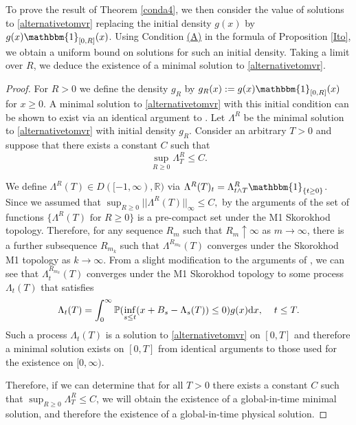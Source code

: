 \documentclass[11pt]{article}
\theoremstyle{plain}
\theoremstyle{remark}
\theoremstyle{definition}
\numberwithin{equation}{section}
\begin{document}
To prove the result of Theorem \ref{conda4}, we then consider the value of solutions to \eqref{alternativetomvr} replacing the initial density $g(x)$ by $g(x)\mathbbm{1}_{[0,R]}(x)$. Using Condition \hyperlink{A}{(A)} in the formula of Proposition \ref{Ito}, we obtain a uniform bound on solutions for such an initial density. Taking a limit over $R$, we deduce the existence of a minimal solution to \eqref{alternativetomvr}. 

\begin{proof}

For $R>0$ we define the density $g_R$ by $g_R(x):=g(x)\mathbbm{1}_{[0,R]}(x)$ for $x\geq 0$. A minimal solution to \eqref{alternativetomvr} with this initial condition can be shown to exist via an identical argument to \cite[Theorem 4.1]{ledger2024supercooledstefanproblemtransport}. Let $\Lambda^R$ be the minimal solution to \eqref{alternativetomvr} with initial density $g_R$. Consider an arbitrary $T>0$ and suppose that there exists a constant $C$ such that $$\sup_{R\geq 0}\Lambda_T^{R}\leq  C.$$ 

We define $\Lambda^R(T)\in D([-1,\infty),\mathbb{R})$ via $\Lambda^R(T)_t=\Lambda^R_{t\wedge T}\mathbbm{1}_{\{t\geq 0\}}$. Since we assumed that $\sup_{R\geq 0}||\Lambda^{R}(T)||_\infty\leq C,$ by the arguments of \cite[Theorem 12.12.2]{whitt} the set of functions $\{\Lambda^{R}(T) \textrm{ for }{R\geq 0}\}$ is a pre-compact set under the M1 Skorokhod topology. Therefore, for any sequence $R_m$ such that $R_m\uparrow\infty$ as $m\rightarrow\infty$, there is a further subsequence $R_{m_k}$ such that $\Lambda^{R_{m_k}}(T)$ converges under the Skorokhod M1 topology as $k\rightarrow\infty$. From a slight modification to the arguments of \cite[Proposition 2.1]{minimal}, we can see that $\Lambda^{R_{m_k}}_t(T)$
converges under the M1 Skorokhod topology to some process $\Lambda_t(T)$ that satisfies
\begin{align}\label{a4sol}\Lambda_t(T)=\int_0^\infty \mathbb{P}(\inf_{s\leq t}(x+B_s-\Lambda_s(T))\leq 0) g(x)\textrm{d}x, \hspace{0.4cm} t\leq T.\end{align}
Such a process $\Lambda_t(T)$ is a solution to \eqref{alternativetomvr} on $[0,T]$ and therefore a minimal solution exists on $[0,T]$ from identical arguments to those used for the existence on $[0,\infty)$. 

Therefore, if we can determine that for all $T>0$ there exists a constant $ C$ such that $\sup_{R\geq 0}\Lambda_T^{R}\leq C$, we will obtain the existence of a global-in-time minimal solution, and therefore the existence of a global-in-time physical solution.


\end{proof}
\end{document}
